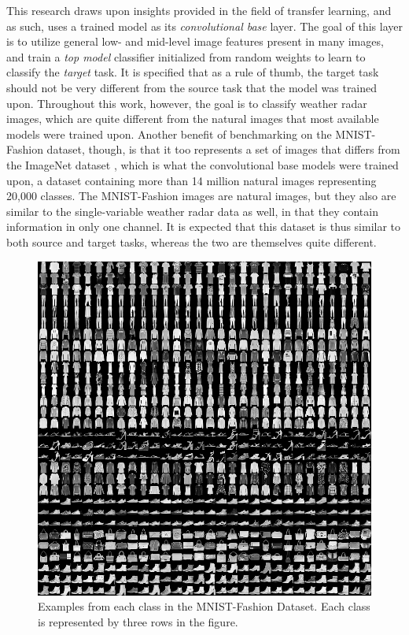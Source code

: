 This research draws upon insights provided in the field of transfer learning, and as such, uses a trained model as its \textit{convolutional base} layer.
The goal of this layer is to utilize general low- and mid-level image features present in many images, and train a \textit{top model} classifier initialized from random weights to learn to classify the \textit{target} task.
It is specified that as a rule of thumb, the target task should not be very different from the source task that the model was trained upon\cite{yosinski2014transferable}.
Throughout this work, however, the goal is to classify weather radar images, which are quite different from the natural images that most available models were trained upon.
Another benefit of benchmarking on the MNIST-Fashion dataset, though, is that it too represents a set of images that differs from the ImageNet dataset \cite{imagenet_cvpr09}, which is what the convolutional base models were trained upon, a dataset containing more than 14 million natural images representing 20,000 classes.
The MNIST-Fashion images are natural images, but they also are similar to the single-variable weather radar data as well, in that they contain information in only one channel.
It is expected that this dataset is thus similar to both source and target tasks, whereas the two are themselves quite different.

\begin{figure}[h]
	\includegraphics[width=\textwidth]{thesis_code/fashion-mnist-sprite.png}
	\caption{Examples from each class in the MNIST-Fashion Dataset. Each class is represented by three rows in the figure.}
	\label{fig:classifying_fashion-mnist}
\end{figure}


